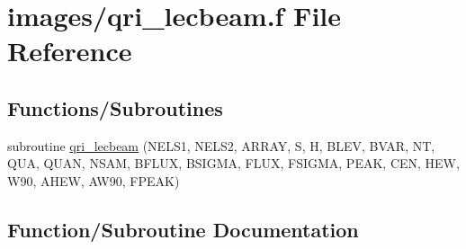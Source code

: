 \hypertarget{qri__lecbeam_8f}{}\section{images/qri\+\_\+lecbeam.f File Reference}
\label{qri__lecbeam_8f}
\subsection*{Functions/\+Subroutines}
\begin{DoxyCompactItemize}
\item 
subroutine \hyperlink{qri__lecbeam_8f_afe9cf6d5e7eed1a2f701b76ca1d3b267}{qri\+\_\+lecbeam} (N\+E\+L\+S1, N\+E\+L\+S2, A\+R\+R\+AY, S, H, B\+L\+EV, B\+V\+AR, NT, Q\+UA, Q\+U\+AN, N\+S\+AM, B\+F\+L\+UX, B\+S\+I\+G\+MA, F\+L\+UX, F\+S\+I\+G\+MA, P\+E\+AK, C\+EN, H\+EW, W90, A\+H\+EW, A\+W90, F\+P\+E\+AK)
\end{DoxyCompactItemize}


\subsection{Function/\+Subroutine Documentation}
\mbox{\label{qri__lecbeam_8f_afe9cf6d5e7eed1a2f701b76ca1d3b267}} 
